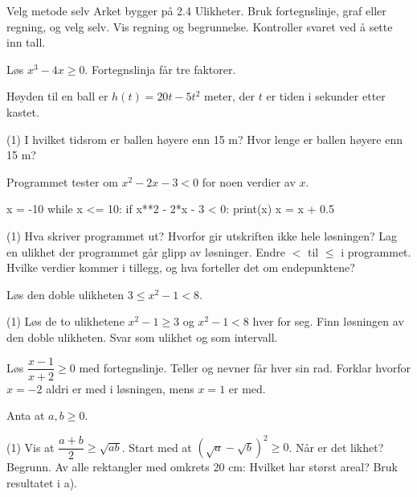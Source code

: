 
\begin{infoboks}{Velg metode selv}
Arket bygger på 2.4 Ulikheter. Bruk fortegnslinje, graf eller regning, og velg selv.
Vis regning og begrunnelse. Kontroller svaret ved å sette inn tall.
\end{infoboks}


Løs $x^3 - 4x \ge 0$. Fortegnslinja får tre faktorer.

Høyden til en ball er $h(t) = 20t - 5t^2$ meter, der $t$ er tiden i sekunder etter kastet.
\begin{tasks}(1)
  \task I hvilket tidsrom er ballen høyere enn 15 m?
  \task Hvor lenge er ballen høyere enn 15 m?
\end{tasks}

Programmet tester om $x^2 - 2x - 3 < 0$ for noen verdier av $x$.
\begin{kode}
x = -10
while x <= 10:
    if x**2 - 2*x - 3 < 0:
        print(x)
    x = x + 0.5
\end{kode}
\begin{tasks}(1)
  \task Hva skriver programmet ut?
  \task Hvorfor gir utskriften ikke hele løsningen? Lag en ulikhet der programmet går glipp av løsninger.
  \task Endre $<$ til $\le$ i programmet. Hvilke verdier kommer i tillegg, og hva forteller det om endepunktene?
\end{tasks}

Løs den doble ulikheten $3 \le x^2 - 1 < 8$.
\begin{tasks}(1)
  \task Løs de to ulikhetene $x^2 - 1 \ge 3$ og $x^2 - 1 < 8$ hver for seg.
  \task Finn løsningen av den doble ulikheten. Svar som ulikhet og som intervall.
\end{tasks}


Løs $\dfrac{x - 1}{x + 2} \ge 0$ med fortegnslinje. Teller og nevner får hver sin rad.
Forklar hvorfor $x = -2$ aldri er med i løsningen, mens $x = 1$ er med.

Anta at $a, b \ge 0$.
\begin{tasks}(1)
  \task Vis at $\dfrac{a + b}{2} \ge \sqrt{ab}$. Start med at $(\sqrt{a} - \sqrt{b})^2 \ge 0$.
  \task Når er det likhet? Begrunn.
  \task Av alle rektangler med omkrets 20 cm: Hvilket har størst areal? Bruk resultatet i a).
\end{tasks}

